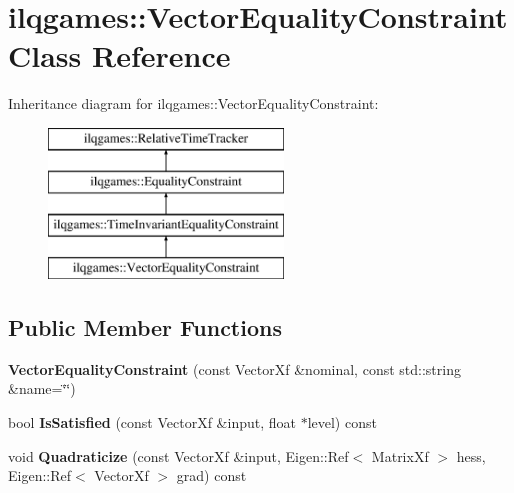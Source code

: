 \hypertarget{classilqgames_1_1_vector_equality_constraint}{}\section{ilqgames\+:\+:Vector\+Equality\+Constraint Class Reference}
\label{classilqgames_1_1_vector_equality_constraint}
Inheritance diagram for ilqgames\+:\+:Vector\+Equality\+Constraint\+:\begin{figure}[H]
\begin{center}
\leavevmode
\includegraphics[height=4.000000cm]{classilqgames_1_1_vector_equality_constraint}
\end{center}
\end{figure}
\subsection*{Public Member Functions}
\begin{DoxyCompactItemize}
\item 
{\bfseries Vector\+Equality\+Constraint} (const Vector\+Xf \&nominal, const std\+::string \&name=\char`\"{}\char`\"{})\hypertarget{classilqgames_1_1_vector_equality_constraint_a31f10c89bb428af71911539614092241}{}\label{classilqgames_1_1_vector_equality_constraint_a31f10c89bb428af71911539614092241}

\item 
bool {\bfseries Is\+Satisfied} (const Vector\+Xf \&input, float $\ast$level) const \hypertarget{classilqgames_1_1_vector_equality_constraint_a3ba52236347c8d587f1312add788823d}{}\label{classilqgames_1_1_vector_equality_constraint_a3ba52236347c8d587f1312add788823d}

\item 
void {\bfseries Quadraticize} (const Vector\+Xf \&input, Eigen\+::\+Ref$<$ Matrix\+Xf $>$ hess, Eigen\+::\+Ref$<$ Vector\+Xf $>$ grad) const \hypertarget{classilqgames_1_1_vector_equality_constraint_a484f6d7e9cae66e028ad480715c88577}{}\label{classilqgames_1_1_vector_equality_constraint_a484f6d7e9cae66e028ad480715c88577}

\end{DoxyCompactItemize}
